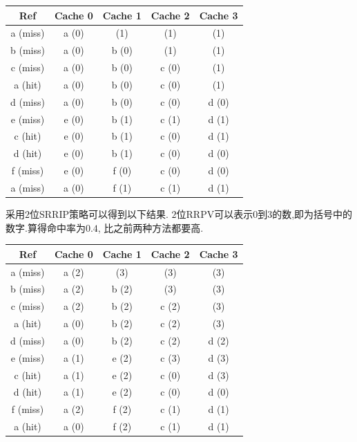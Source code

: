 \documentclass[adobefonts, nocap]{ctexart}
\begin{document}
    \begin{center}
      \begin{tabular}{c||c|c|c|c}
        Ref & Cache 0 & Cache 1 & Cache 2 & Cache 3 \\ \hline
        a (miss) & a (0) & (1) & (1) & (1) \\
        b (miss) & a (0) & b (0) & (1) & (1) \\
        c (miss) & a (0) & b (0) & c (0) & (1) \\
        a (hit) & a (0) & b (0) & c (0) & (1) \\
        d (miss) & a (0) & b (0) & c (0) & d (0) \\
        e (miss) & e (0) & b (1) & c (1) & d (1) \\
        c (hit) & e (0) & b (1) & c (0) & d (1) \\
        d (hit) & e (0) & b (1) & c (0) & d (0) \\
        f (miss) & e (0) & f (0) & c (0) & d (0) \\
        a (miss) & a (0) & f (1) & c (1) & d (1) \\
      \end{tabular}
    \end{center}

    采用$2$位SRRIP策略可以得到以下结果. $2$位RRPV可以表示$0$到$3$的数,即为括号中的数字.算得命中率为$0.4$,
    比之前两种方法都要高.

    \begin{center}
      \begin{tabular}{c||c|c|c|c}
        Ref & Cache 0 & Cache 1 & Cache 2 & Cache 3 \\ \hline
        a (miss) & a (2) & (3) & (3) & (3) \\
        b (miss) & a (2) & b (2) & (3) & (3) \\
        c (miss) & a (2) & b (2) & c (2) & (3) \\
        a (hit) & a (0) & b (2) & c (2) & (3) \\
        d (miss) & a (0) & b (2) & c (2) & d (2) \\
        e (miss) & a (1) & e (2) & c (3) & d (3) \\
        c (hit) & a (1) & e (2) & c (0) & d (3) \\
        d (hit) & a (1) & e (2) & c (0) & d (0) \\
        f (miss) & a (2) & f (2) & c (1) & d (1) \\
        a (hit) & a (0) & f (2) & c (1) & d (1) \\
      \end{tabular}
    \end{center}
\end{document}
